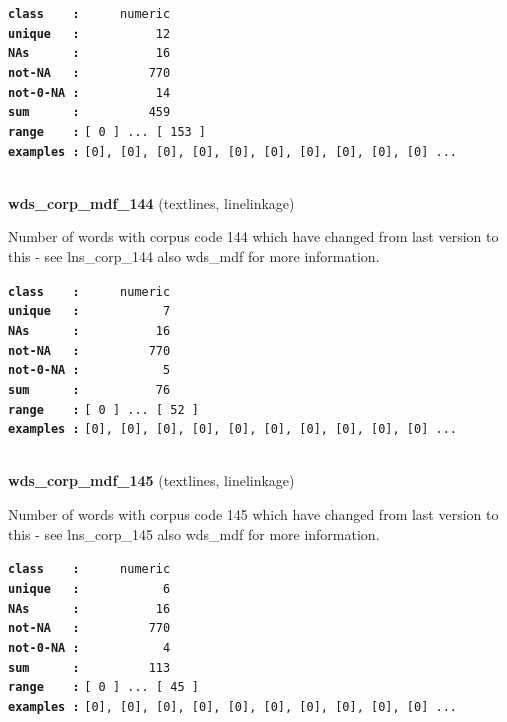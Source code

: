 \documentclass[]{article}
\begin{document}
\textbf{\texttt{class\ \ \ \ :}} \texttt{~~~~~numeric}\\
\textbf{\texttt{unique\ \ \ :}} \texttt{~~~~~~~~~~12}\\
\textbf{\texttt{NAs\ \ \ \ \ \ :}} \texttt{~~~~~~~~~~16}\\
\textbf{\texttt{not-NA\ \ \ :}} \texttt{~~~~~~~~~770}\\
\textbf{\texttt{not-0-NA\ :}} \texttt{~~~~~~~~~~14}\\
\textbf{\texttt{sum\ \ \ \ \ \ :}} \texttt{~~~~~~~~~459}\\
\textbf{\texttt{range\ \ \ \ :}}
\texttt{{[}\ 0\ {]}\ ...\ {[}\ 153\ {]}}\\
\textbf{\texttt{examples\ :}}
\texttt{{[}0{]},\ {[}0{]},\ {[}0{]},\ {[}0{]},\ {[}0{]},\ {[}0{]},\ {[}0{]},\ {[}0{]},\ {[}0{]},\ {[}0{]}\ ...}\\

~

\textbf{wds\_corp\_mdf\_144} (textlines, linelinkage)

Number of words with corpus code 144 which have changed from last
version to this - see lns\_corp\_144 also wds\_mdf for more information.

\textbf{\texttt{class\ \ \ \ :}} \texttt{~~~~~numeric}\\
\textbf{\texttt{unique\ \ \ :}} \texttt{~~~~~~~~~~~7}\\
\textbf{\texttt{NAs\ \ \ \ \ \ :}} \texttt{~~~~~~~~~~16}\\
\textbf{\texttt{not-NA\ \ \ :}} \texttt{~~~~~~~~~770}\\
\textbf{\texttt{not-0-NA\ :}} \texttt{~~~~~~~~~~~5}\\
\textbf{\texttt{sum\ \ \ \ \ \ :}} \texttt{~~~~~~~~~~76}\\
\textbf{\texttt{range\ \ \ \ :}}
\texttt{{[}\ 0\ {]}\ ...\ {[}\ 52\ {]}}\\
\textbf{\texttt{examples\ :}}
\texttt{{[}0{]},\ {[}0{]},\ {[}0{]},\ {[}0{]},\ {[}0{]},\ {[}0{]},\ {[}0{]},\ {[}0{]},\ {[}0{]},\ {[}0{]}\ ...}\\

~

\textbf{wds\_corp\_mdf\_145} (textlines, linelinkage)

Number of words with corpus code 145 which have changed from last
version to this - see lns\_corp\_145 also wds\_mdf for more information.

\textbf{\texttt{class\ \ \ \ :}} \texttt{~~~~~numeric}\\
\textbf{\texttt{unique\ \ \ :}} \texttt{~~~~~~~~~~~6}\\
\textbf{\texttt{NAs\ \ \ \ \ \ :}} \texttt{~~~~~~~~~~16}\\
\textbf{\texttt{not-NA\ \ \ :}} \texttt{~~~~~~~~~770}\\
\textbf{\texttt{not-0-NA\ :}} \texttt{~~~~~~~~~~~4}\\
\textbf{\texttt{sum\ \ \ \ \ \ :}} \texttt{~~~~~~~~~113}\\
\textbf{\texttt{range\ \ \ \ :}}
\texttt{{[}\ 0\ {]}\ ...\ {[}\ 45\ {]}}\\
\textbf{\texttt{examples\ :}}
\texttt{{[}0{]},\ {[}0{]},\ {[}0{]},\ {[}0{]},\ {[}0{]},\ {[}0{]},\ {[}0{]},\ {[}0{]},\ {[}0{]},\ {[}0{]}\ ...}\\
\end{document}
